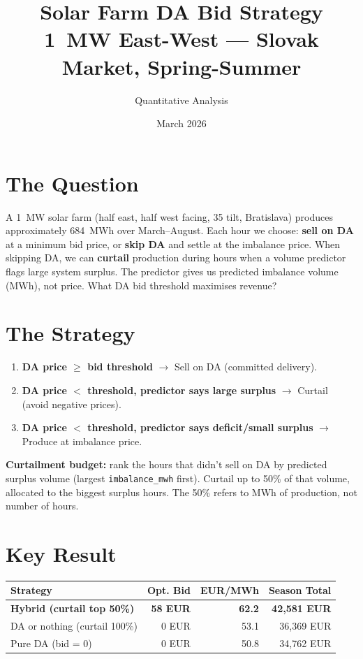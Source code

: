 \documentclass[11pt,a4paper]{article}
\title{\textbf{Solar Farm DA Bid Strategy}\\[0.3em]
\large 1~MW East-West --- Slovak Market, Spring-Summer}
\author{Quantitative Analysis}
\date{March 2026}
\begin{document}
\maketitle
\vspace{-1.5em}

\section*{The Question}

A 1~MW solar farm (half east, half west facing, 35\textdegree{} tilt, Bratislava) produces approximately 684~MWh over March--August. Each hour we choose: \textbf{sell on DA} at a minimum bid price, or \textbf{skip DA} and settle at the imbalance price. When skipping DA, we can \textbf{curtail} production during hours when a volume predictor flags large system surplus. The predictor gives us predicted imbalance volume (MWh), not price. What DA bid threshold maximises revenue?

\section*{The Strategy}

\begin{enumerate}[leftmargin=*, itemsep=0.1em]
    \item \textbf{DA price $\geq$ bid threshold} $\rightarrow$ Sell on DA (committed delivery).
    \item \textbf{DA price $<$ threshold, predictor says large surplus} $\rightarrow$ Curtail (avoid negative prices).
    \item \textbf{DA price $<$ threshold, predictor says deficit/small surplus} $\rightarrow$ Produce at imbalance price.
\end{enumerate}

\textbf{Curtailment budget:} rank the hours that didn't sell on DA by predicted surplus volume (largest \texttt{imbalance\_mwh} first). Curtail up to 50\% of that volume, allocated to the biggest surplus hours. The 50\% refers to MWh of production, not number of hours.

\section*{Key Result}

\begin{table}[H]
\centering
\begin{tabular}{lrrr}
\toprule
\textbf{Strategy} & \textbf{Opt. Bid} & \textbf{EUR/MWh} & \textbf{Season Total} \\
\midrule
\textbf{Hybrid (curtail top 50\%)} & \textbf{58 EUR} & \textbf{62.2} & \textbf{42,581 EUR} \\
DA or nothing (curtail 100\%) & 0 EUR & 53.1 & 36,369 EUR \\
Pure DA (bid = 0) & 0 EUR & 50.8 & 34,762 EUR \\
\bottomrule
\end{tabular}
\end{table}
\end{document}
